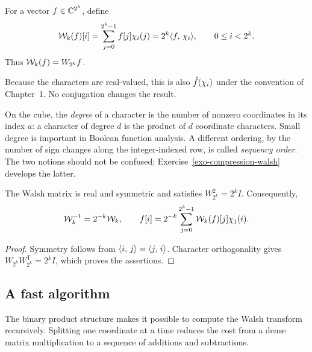 
\begin{defn}
\label{notation-33}
For a vector $f\in\mathbb{C}^{2^k}$, define
\begin{equation}
\label{eq-formula-defn-trans-walsh}
 \mathcal{W}_k(f)[i]=\sum_{j=0}^{2^k-1}f[j]\chi_i(j)
 =2^k\langle f,\,\chi_i\rangle,\qquad 0\leq i<2^k.
\end{equation}
Thus $\mathcal{W}_k(f)=W_{2^k}f$.
\end{defn}
Because the characters are real-valued, this is also $\hat{f}(\chi_i)$ under
the convention of Chapter~1. No conjugation changes the result.

On the cube, the \emph{degree} of a character is the number of nonzero
coordinates in its index $a$: a character of degree $d$ is the product of
$d$ coordinate characters. Small degree is important in Boolean function
analysis. A different ordering, by the number of sign changes along the
integer-indexed row, is called \emph{sequency order}. The two notions should
not be confused; Exercise~\ref{exo-compression-walsh} develops the latter.


\begin{prop}[Inversion]
\label{prop-pte-matrix-hadamard}
The Walsh matrix is real and symmetric and satisfies
$W_{2^k}^2=2^kI$. Consequently,
\[
 \mathcal{W}_k^{-1}=2^{-k}\mathcal{W}_k,
 \qquad
 f[i]=2^{-k}\sum_{j=0}^{2^k-1}\mathcal{W}_k(f)[j]\chi_j(i).
\]
\end{prop}
\begin{proof}
Symmetry follows from $\langle i,\,j\rangle=\langle j,\,i\rangle$. Character orthogonality gives
$W_{2^k}W_{2^k}^{\mathsf T}=2^kI$, which proves the assertions.
\end{proof}

\subsection{A fast algorithm}
\label{sect2-fwt}

The binary product structure makes it possible to compute the Walsh
transform recursively. Splitting one coordinate at a time reduces the cost
from a dense matrix multiplication to a sequence of additions and
subtractions.

